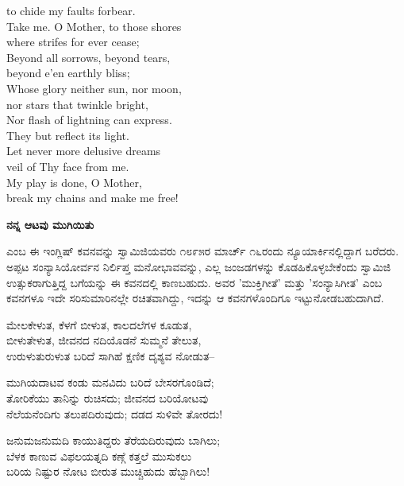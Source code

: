 \begin{myquote}
{to chide my faults forbear.\\
Take me. O Mother, to those shores\\
where strifes for ever cease;\\
Beyond all sorrows, beyond tears,\\
beyond e’en earthly bliss;\\
Whose glory neither sun, nor moon,\\
nor stars that twinkle bright,\\
Nor flash of lightning can express.\\
They but reflect its light.\\
Let never more delusive dreams\\
veil of Thy face from me.\\
My play is done, O Mother,\\
break my chains and make me free!}
\end{myquote}

\selectkan

\begin{center}
\textbf{ನನ್ನ ಆಟವು ಮುಗಿಯಿತು}
\end{center}

 ಎಂಬ ಈ ಇಂಗ್ಲಿಷ್ ಕವನವನ್ನು ಸ್ವಾಮಿಜಿಯವರು ೧೮೯೫ರ ಮಾರ್ಚ್ ೧೬ರಂದು ನ್ಯೂಯಾರ್ಕಿನಲ್ಲಿದ್ದಾಗ ಬರೆದರು. ಅಪ್ಪಟ ಸಂನ್ಯಾಸಿಯೋರ್ವನ ನಿರ್ಲಿಪ್ತ ಮನೋಭಾವವನ್ನು, ಎಲ್ಲ ಜಂಜಡಗಳನ್ನು ಕೊಡಹಿಕೊಳ್ಳಬೇಕೆಂದು ಸ್ವಾಮಿಜಿ ಉತ್ಸುಕರಾಗುತ್ತಿದ್ದ ಬಗೆಯನ್ನು ಈ ಕವನದಲ್ಲಿ ಕಾಣಬಹುದು. ಅವರ 'ಮುಕ್ತಿಗೀತೆ' ಮತ್ತು 'ಸಂನ್ಯಾಸಿಗೀತ' ಎಂಬ ಕವನಗಳೂ ಇದೇ ಸರಿಸುಮಾರಿನಲ್ಲೇ ರಚಿತವಾಗಿದ್ದು, ಇದನ್ನು ಆ ಕವನಗಳೊಂದಿಗೂ ಇಟ್ಟುನೋಡಬಹುದಾಗಿದೆ.

\begin{myquote}
ಮೇಲಕೇಳುತ, ಕೆಳಗೆ ಬೀಳುತ, ಕಾಲದಲೆಗಳ ಕೂಡುತ,\\ಬೀಳುತೇಳುತ, ಜೀವನದ ನದಿಯೊಡನೆ ಸುಮ್ಮನೆ ತೇಲುತ,\\ಉರುಳುತುರುಳುತ ಬರಿದೆ ಸಾಗಿಹೆ ಕ್ಷಣಿಕ ದೃಶ್ಯವ ನೋಡುತ–
\end{myquote}

\begin{myquote}
ಮುಗಿಯದಾಟವ ಕಂಡು ಮನವಿದು ಬರಿದೆ ಬೇಸರಗೊಂಡಿದೆ;\\ತೋರಿಕೆಯು ತಾನಿನ್ನು ರುಚಿಸದು; ಜೀವನದ ಬರಿಯೋಟವು\\ನೆಲೆಯನೆಂದಿಗು ತಲುಪದಿರುವುದು; ದಡದ ಸುಳಿವೇ ತೋರದು!
\end{myquote}

\begin{myquote}
ಜನುಮಜನುಮದಿ ಕಾಯುತಿದ್ದರು ತೆರೆಯದಿರುವುದು ಬಾಗಿಲು;\\ಬೆಳಕ ಕಾಣುವ ವಿಫಲಯತ್ನದಿ ಕಣ್ಗೆ ಕತ್ತಲೆ ಮುಸುಕಲು\\ಬರಿಯ ನಿಷ್ಟುರ ನೋಟ ಬೀರುತ ಮುಚ್ಚಿಹುದು ಹೆಬ್ಬಾಗಿಲು!
\end{myquote}

